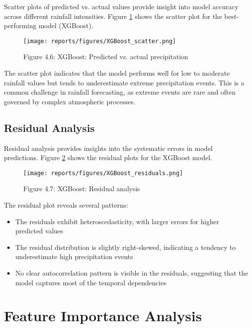 \documentclass[12pt]{article}
\begin{document}
Scatter plots of predicted vs. actual values provide insight into model accuracy across different rainfall intensities. Figure \ref{fig:chap4_fig6_xgb_scatter} shows the scatter plot for the best-performing model (XGBoost).

\begin{figure}[h]
\centering
\texttt{[image: reports/figures/XGBoost\_scatter.png]}
\caption{Figure 4.6: XGBoost: Predicted vs. actual precipitation}
\label{fig:chap4_fig6_xgb_scatter}
\end{figure}

The scatter plot indicates that the model performs well for low to moderate rainfall values but tends to underestimate extreme precipitation events. This is a common challenge in rainfall forecasting, as extreme events are rare and often governed by complex atmospheric processes.

\subsection{Residual Analysis}
\label{subsec:residual_results}

Residual analysis provides insights into the systematic errors in model predictions. Figure \ref{fig:chap4_fig7_xgb_residuals} shows the residual plots for the XGBoost model.

\begin{figure}[h]
\centering
\texttt{[image: reports/figures/XGBoost\_residuals.png]}
\caption{Figure 4.7: XGBoost: Residual analysis}
\label{fig:chap4_fig7_xgb_residuals}
\end{figure}

The residual plot reveals several patterns:
\begin{itemize}
    \item The residuals exhibit heteroscedasticity, with larger errors for higher predicted values
    \item The residual distribution is slightly right-skewed, indicating a tendency to underestimate high precipitation events
    \item No clear autocorrelation pattern is visible in the residuals, suggesting that the model captures most of the temporal dependencies
\end{itemize}

\section{Feature Importance Analysis}
\label{sec:feature_importance_results}
\end{document}
